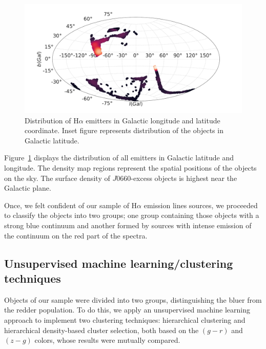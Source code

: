 \documentclass[fleqn,usenatbib]{mnras}
\begin{document}
\begin{figure}
\includegraphics[width=0.9\linewidth]{Figs/halpha-emitters-galactic-aitoff.pdf}
\centering
{}
\caption{Distribution of H{$\alpha$} emitters in Galactic longitude and latitude
  coordinate. Inset figure represents distribution of the objects in Galactic latitude.}
\label{fig:aitoff-distribution}
\end{figure}

Figure~\ref{fig:aitoff-distribution} displays the distribution of all emitters in Galactic 
latitude and longitude. The density map regions represent the spatial positions of the objects
on the sky. The surface density of $J$0660-excess objects is highest near the Galactic plane.

Once, we felt confident of our sample of H{$\alpha$} emission lines sources,
we proceeded to classify the objects into two groups; one group containing those
objects with a strong blue continuum and another formed by sources with  intense emission of the
continuum on the red part of the spectra. 

\subsection{Unsupervised machine learning/clustering techniques}
\label{sec:clustering}

Objects of our sample were
divided 
into two groups,
distinguishing the bluer from the redder population.
To do this, we apply an unsupervised machine learning approach to implement
 two clustering techniques: hierarchical clustering and hierarchical
density-based cluster selection, both based on the $(g - r)$ and $(z - g)$ colors, 
whose results were mutually compared. 
\end{document}
